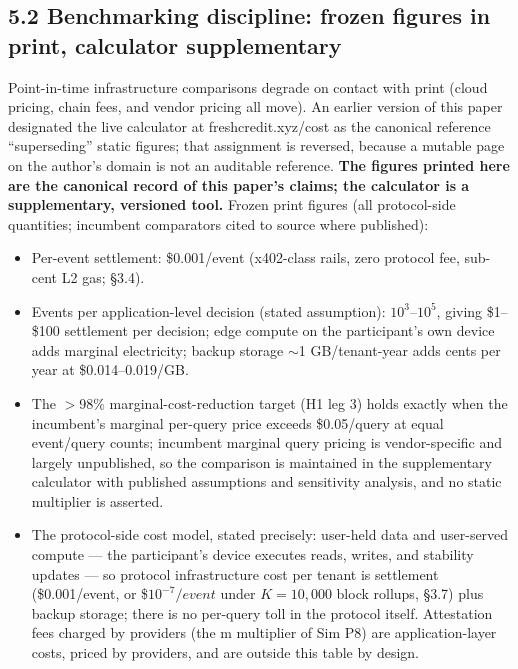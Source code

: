 \documentclass[11pt,twocolumn]{article}
\providecommand{\tightlist}{\setlength{\itemsep}{0pt}\setlength{\parskip}{0pt}}
\begin{document}
\subsection*{5.2 Benchmarking discipline: frozen figures in print,
calculator
supplementary}

Point-in-time infrastructure comparisons degrade on contact with print
(cloud pricing, chain fees, and vendor pricing all move). An earlier
version of this paper designated the live calculator at
freshcredit.xyz/cost as the canonical reference ``superseding'' static
figures; that assignment is reversed, because a mutable page on the
author's domain is not an auditable reference. \textbf{The figures
printed here are the canonical record of this paper's claims; the
calculator is a supplementary, versioned tool.} Frozen print figures
(all protocol-side quantities; incumbent comparators cited to source
where published):

\begin{itemize}
\tightlist
\item
  Per-event settlement: \$0.001/event (x402-class rails, zero protocol
  fee, sub-cent L2 gas; §3.4).
\item
  Events per application-level decision (stated assumption):
  \(10^{3}–10^{5}\), giving \$1--\$100 settlement per decision; edge
  compute on the participant's own device adds marginal electricity;
  backup storage $\sim$1 GB/tenant-year adds cents per year at
  \$0.014--0.019/GB.
\item
  The \(>\)98\% marginal-cost-reduction target (H1 leg 3) holds
  exactly when the incumbent's marginal per-query price exceeds
  \$0.05/query at equal event/query counts; incumbent marginal query
  pricing is vendor-specific and largely unpublished, so the comparison
  is maintained in the supplementary calculator with published
  assumptions and sensitivity analysis, and no static multiplier is
  asserted.
\item
  The protocol-side cost model, stated precisely: user-held data and
  user-served compute --- the participant's device executes reads,
  writes, and stability updates --- so protocol infrastructure cost per
  tenant is settlement (\$0.001/event, or \$\(10^{-7}/event\) under
  \(K = 10,000\) block rollups, §3.7) plus backup storage; there is no
  per-query toll in the protocol itself. Attestation fees charged by
  providers (the m multiplier of Sim P8) are application-layer costs,
  priced by providers, and are outside this table by design.
\end{itemize}
\end{document}
